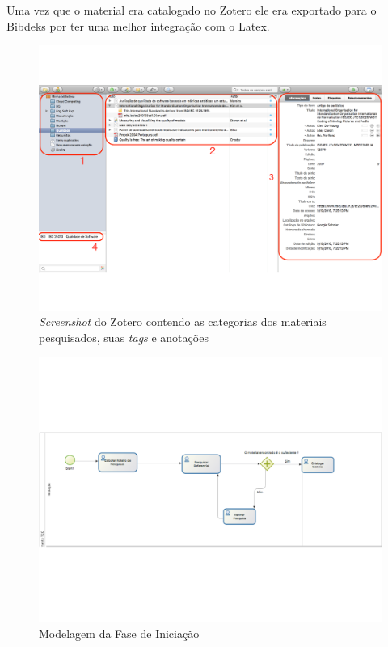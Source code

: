 Uma vez que o material era catalogado no Zotero ele era exportado para o Bibdeks por ter uma melhor integração com o Latex.
\graphicspath{{figuras/}}
\begin{figure}[h]
\centering
\includegraphics[scale=0.50]{zotero_edit2}
\caption{\textit{Screenshot} do Zotero contendo as categorias dos materiais pesquisados, suas \textit{tags} e anotações}
\label{img:zotero}
\end{figure}

\graphicspath{{figuras/}}
\begin{figure}[h]
\centering
\includegraphics[scale=0.50]{iniciacao}
\caption{Modelagem da Fase de Iniciação}
\label{img:iniciacao}
\end{figure}


